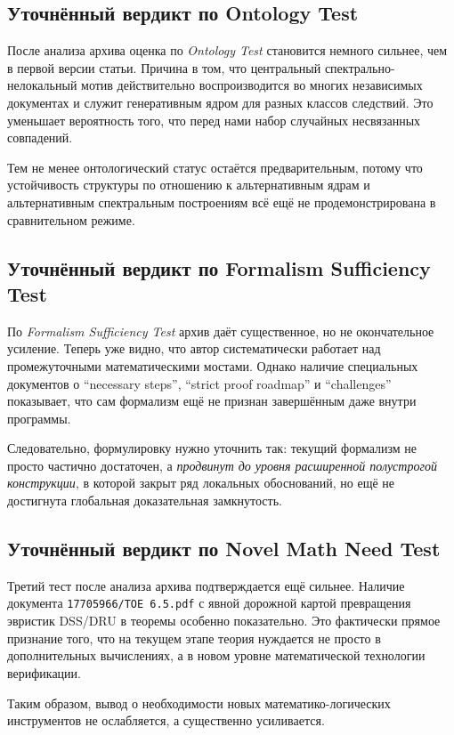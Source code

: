 \documentclass[12pt,a4paper]{article}
\begin{document}
\subsection{Уточнённый вердикт по Ontology Test}

После анализа архива оценка по \emph{Ontology Test} становится немного сильнее, чем в первой версии статьи. Причина в том, что центральный спектрально-нелокальный мотив действительно воспроизводится во многих независимых документах и служит генеративным ядром для разных классов следствий. Это уменьшает вероятность того, что перед нами набор случайных несвязанных совпадений.

Тем не менее онтологический статус остаётся предварительным, потому что устойчивость структуры по отношению к альтернативным ядрам и альтернативным спектральным построениям всё ещё не продемонстрирована в сравнительном режиме.

\subsection{Уточнённый вердикт по Formalism Sufficiency Test}

По \emph{Formalism Sufficiency Test} архив даёт существенное, но не окончательное усиление. Теперь уже видно, что автор систематически работает над промежуточными математическими мостами. Однако наличие специальных документов о ``necessary steps'', ``strict proof roadmap'' и ``challenges'' показывает, что сам формализм ещё не признан завершённым даже внутри программы.

Следовательно, формулировку нужно уточнить так: текущий формализм не просто частично достаточен, а \emph{продвинут до уровня расширенной полустрогой конструкции}, в которой закрыт ряд локальных обоснований, но ещё не достигнута глобальная доказательная замкнутость.

\subsection{Уточнённый вердикт по Novel Math Need Test}

Третий тест после анализа архива подтверждается ещё сильнее. Наличие документа \texttt{17705966/ТОЕ 6.5.pdf} с явной дорожной картой превращения эвристик DSS/DRU в теоремы особенно показательно. Это фактически прямое признание того, что на текущем этапе теория нуждается не просто в дополнительных вычислениях, а в новом уровне математической технологии верификации.

Таким образом, вывод о необходимости новых математико-логических инструментов не ослабляется, а существенно усиливается.
\end{document}
